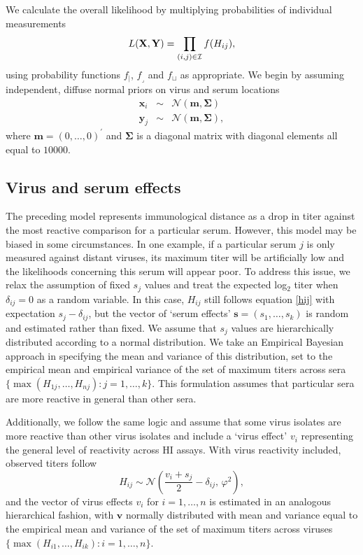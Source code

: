 \documentclass[11pt,oneside,letterpaper]{article}
\newcommand{\virus}{\mathbf{x}}						%
\newcommand{\serum}{\mathbf{y}}						%
\newcommand{\viruses}{\mathbf{X}}					%
\newcommand{\sera}{\mathbf{Y}}						%
\newcommand{\ve}{v}									%
\newcommand{\se}{s}									%
\newcommand{\ves}{\mathbf{v}}						%
\newcommand{\ses}{\mathbf{s}}						%
\newcommand{\point}{f_{\scriptscriptstyle \vert}}	%
\newcommand{\threshold}{f_{\textstyle \lrcorner}}	%
\newcommand{\interval}{f_{\sqcup}}					%
\newcommand{\mdssd}{\varphi}						%
\newcommand{\vn}{n}									%
\newcommand{\sn}{k}									%
\newcommand{\normal}{\mathcal{N}}					%
\begin{document}
We calculate the overall likelihood by multiplying probabilities of individual measurements
\begin{equation}  \label{bmds}
	L(\viruses,\sera) = \prod_{(i,j) \in \cal I} f(H_{ij}),
\end{equation}
using probability functions $\point$, $\threshold$ and $\interval$ as appropriate.
We begin by assuming independent, diffuse normal priors on virus and serum locations
\begin{eqnarray}
	\virus_i &\sim& \normal(\mathbf{m},\boldsymbol{\Sigma}) \nonumber \\
	\serum_j &\sim& \normal(\mathbf{m},\boldsymbol{\Sigma}),
\end{eqnarray}
where $\mathbf{m} = (0,\ldots,0)^{\prime}$ and $\boldsymbol{\Sigma}$ is a diagonal matrix with diagonal elements all equal to $10000$.

\subsection*{Virus and serum effects}

The preceding model represents immunological distance as a drop in titer against the most reactive comparison for a particular serum.
However, this model may be biased in some circumstances.
In one example, if a particular serum $j$ is only measured against distant viruses, its maximum titer will be artificially low and the likelihoods concerning this serum will appear poor. 
To address this issue, we relax the assumption of fixed $\se_j$ values and treat the expected log$_2$ titer when $\delta_{ij}=0$ as a random variable.
In this case, $H_{ij}$ still follows equation \ref{hij} with expectation $\se_j - \delta_{ij}$, but the vector of `serum effects' $\ses = (\se_1,\ldots,\se_{\sn})$ is random and estimated rather than fixed.
We assume that $\se_j$ values are hierarchically distributed according to a normal distribution.   
We take an Empirical Bayesian approach in specifying the mean and variance of this distribution, set to the empirical mean and empirical variance of the set of maximum titers across sera $\{ \max ( H_{1j},\ldots,H_{\vn j} ) : j = 1,\ldots,\sn \}$.
This formulation assumes that particular sera are more reactive in general than other sera.

Additionally, we follow the same logic and assume that some virus isolates are more reactive than other virus isolates and include a `virus effect' $\ve_i$ representing the general level of reactivity across HI assays. 
With virus reactivity included, observed titers follow
\begin{equation}
	H_{ij} \sim \normal \left( \frac{\ve_i+\se_j}{2} - \delta_{ij}, \, \mdssd^2 \right),
\end{equation}
and the vector of virus effects $\ve_i$ for $i = 1,\ldots, \vn$ is estimated in an analogous hierarchical fashion, with $\ves$ normally distributed with mean and variance equal to the empirical mean and variance of the set of maximum titers across viruses $\{ \max ( H_{i1},\ldots,H_{i \sn} ) : i = 1,\ldots,\vn \}$.
\end{document}
